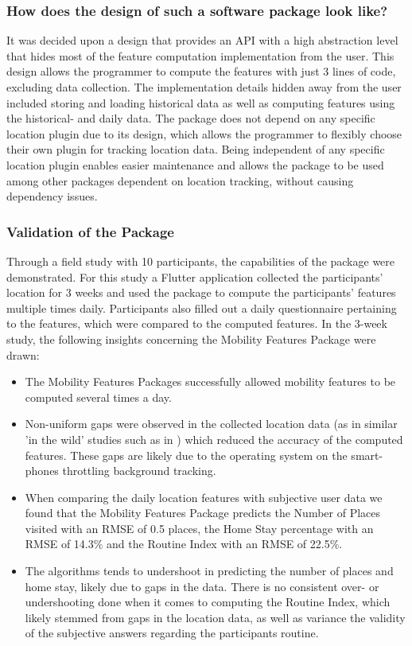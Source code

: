 \subsubsection*{How does the design of such a software package look like?}
It was decided upon a design that provides an API with a high abstraction level that hides most of the feature computation implementation from the user. This design allows the programmer to compute the features with just 3 lines of code, excluding data collection. The implementation details hidden away from the user included storing and loading historical data as well as computing features using the historical- and daily data. The package does not depend on any specific location plugin due to its design, which allows the programmer to flexibly choose their own plugin for tracking location data. Being independent of any specific location plugin enables easier maintenance and allows the package to be used among other packages dependent on location tracking, without causing dependency issues. 

\subsubsection*{Validation of the Package}
Through a field study with 10 participants, the capabilities of the package were demonstrated. For this study a Flutter application collected the participants' location for 3 weeks and used the package to compute the participants' features multiple times daily. Participants also filled out a daily questionnaire pertaining to the features, which were compared to the computed features. In the 3-week study, the following insights concerning the Mobility Features Package were drawn:

\begin{itemize}
    \item The Mobility Features Packages successfully allowed mobility features to be computed several times a day.
    
    \item Non-uniform gaps were observed in the collected location data (as in similar 'in the wild' studies such as in \cite{palmius2017}) which reduced the accuracy of the computed features. These gaps are likely due to the operating system on the smart-phones throttling background tracking.
    
    \item When comparing the daily location features with subjective user data we found that the Mobility Features Package predicts the Number of Places visited with an RMSE of 0.5 places, the Home Stay percentage with an RMSE of 14.3\% and the Routine Index with an RMSE of 22.5\%.
    
    \item The algorithms tends to undershoot in predicting the number of places and home stay, likely due to gaps in the data. There is no consistent over- or undershooting done when it comes to computing the Routine Index, which likely stemmed from gaps in the location data, as well as variance the validity of the subjective answers regarding the participants routine.
\end{itemize}

